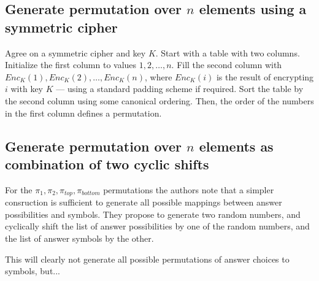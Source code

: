 \subsection{Generate permutation over $n$ elements using a symmetric cipher}
\label{sec:permutations_via_symmetric_cipher}

Agree on a symmetric cipher and key $K$. Start with a table with two columns.
Initialize the first column to values $1, 2, \ldots, n$. Fill the second column
with $Enc_K(1), Enc_K(2), \ldots, Enc_K(n)$, where $Enc_K(i)$ is the result of
encrypting $i$ with key $K$ --- using a standard padding scheme if required.
Sort the table by the second column using some canonical ordering. Then, the
order of the numbers in the first column defines a permutation.

\subsection{Generate permutation over $n$ elements as combination of two cyclic shifts}
\label{sec:permutations_via_shifts}

For the $\pi_1, \pi_2, \pi_{top}, \pi_{bottom}$ permutations the authors note
that a simpler consruction is sufficient to generate all possible mappings
between answer possibilities and symbols. They propose to generate two random
numbers, and cyclically shift the list of answer possibilities by one of the
random numbers, and the list of answer symbols by the other.

This will clearly not generate all possible permutations of answer choices to symbols, but...

